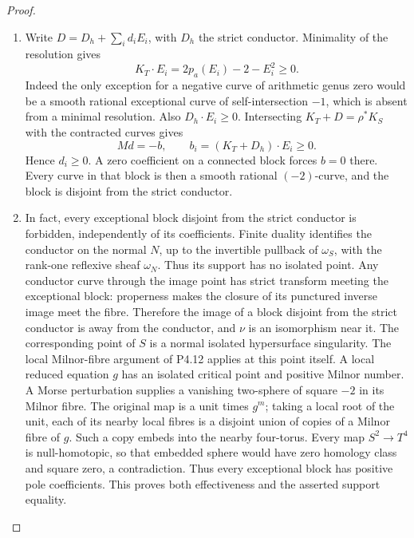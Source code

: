 \begin{proof}
\begin{enumerate}[label={$\langle1\rangle$\arabic*.},leftmargin=*]
\item Write $D=D_h+\sum_i d_iE_i$, with $D_h$
the strict conductor. Minimality of the
resolution gives
\[
 K_T\cdot E_i=2p_a(E_i)-2-E_i^2\ge0.
\]
Indeed the only exception for a negative
curve of arithmetic genus zero would be
a smooth rational exceptional curve of
self-intersection $-1$, which is absent
from a minimal resolution. Also
$D_h\cdot E_i\ge0$. Intersecting
$K_T+D=\rho^*K_S$ with the contracted
curves gives
\[
 Md=-b,
 \qquad b_i=(K_T+D_h)\cdot E_i\ge0.
\]
Hence $d_i\ge0$. A zero coefficient on
a connected block forces $b=0$ there.
Every curve in that block is then a
smooth rational $(-2)$-curve, and the
block is disjoint from the strict
conductor.

\item In fact, every exceptional block disjoint from
the strict conductor is forbidden, independently
of its coefficients. Finite duality identifies
the conductor on the normal $N$, up to the
invertible pullback of $\omega_S$, with the
rank-one reflexive sheaf $\omega_N$. Thus its
support has no isolated point. Any conductor
curve through the image point has strict
transform meeting the exceptional block:
properness makes the closure of its punctured
inverse image meet the fibre. Therefore the
image of a block disjoint from the strict
conductor is away from the conductor, and
$\nu$ is an isomorphism near it. The
corresponding point of $S$ is a normal isolated
hypersurface singularity. The local
Milnor-fibre argument of P4.12 applies
at this point itself. A local reduced
equation $g$ has an isolated critical
point and positive Milnor number. A
Morse perturbation supplies a vanishing
two-sphere of square $-2$ in its Milnor
fibre. The original map is a unit times
$g^m$; taking a local root of the unit,
each of its nearby local fibres is a
disjoint union of copies of a Milnor
fibre of $g$. Such a copy embeds into
the nearby four-torus. Every map
$S^2\to T^4$ is null-homotopic, so that
embedded sphere would have zero
homology class and square zero, a
contradiction. Thus every exceptional
block has positive pole coefficients.
This proves both effectiveness and the
asserted support equality.

\end{enumerate}
\end{proof}
